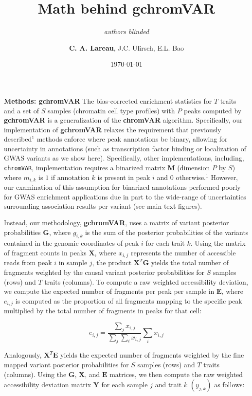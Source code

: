 \documentclass{article}\usepackage[]{graphicx}\usepackage[]{color}
\title{Math behind \textbf{gchromVAR}}
\author{\textit{authors blinded}}
\author{\textbf{C. A. Lareau}, J.C. Ulirsch, E.L. Bao}
\date{\today}
\begin{document}
\maketitle

\noindent \textbf{Methods: gchromVAR} \newline
The bias-corrected enrichment statistics for $T$ traits and a set of $S$ samples (chromatin cell type profiles) with $P$ peaks computed by \textbf{gchromVAR} is a generalization of the \textbf{chromVAR} algorithm. Specifically, our implementation of \textbf{gchromVAR} relaxes the requirement that previously described$^{1}$ methods enforce where peak annotations be binary, allowing for uncertainty in annotations (such as transcription factor binding or localization of GWAS variants as we show here). Specifically, other implementations, including, \texttt{chromVAR}, implementation requires a binarized matrix $\boldsymbol{M}$ (dimension $P$ by $S$) where $m_{i,k}$ is $1$ if annotation $k$ is present in peak $i$ and $0$ otherwise.$^1$ However, our examination of this assumption for binarized annotations performed poorly for GWAS enrichment applications due in part to the wide-range of uncertainties surrounding association results per-variant (see main text figures). \newline

\noindent Instead, our methodology, \textbf{gchromVAR}, uses a matrix of variant posterior probabilities $\boldsymbol{G}$, where $g_{i,k}$ is the sum of the posterior probabilities of the variants contained in the genomic coordinates of peak $i$ for each trait $k$. Using the matrix of fragment counts in peaks $\boldsymbol{X}$, where $x_{i,j}$ represents the number of accessible reads from peak $i$ in sample $j$, the product $\boldsymbol{X}^T\boldsymbol{G}$ yields the total number of fragments weighted by the causal variant posterior probabilities for $S$ samples (rows) and $T$ traits (columns). To compute a raw weighted accessibility deviation, we compute the expected number of fragments per peak per sample in $\boldsymbol{E}$, where $e_{i,j}$  is computed as the proportion of all fragments mapping to the specific peak multiplied by the total number of fragments in peaks for that cell: 

$$ e_{i,j} = \frac{\sum_jx_{i,j}}{\sum_j\sum_ix_{i,j}} \sum_ix_{i,j}$$

\noindent Analogously, $\boldsymbol{X}^T\boldsymbol{E}$ yields the expected number of fragments weighted by the fine mapped variant posterior probabilities for $S$ samples (rows) and $T$ traits (columns). Using the $\boldsymbol{G}$,  $\boldsymbol{X}$, and  $\boldsymbol{E}$ matrices, we then compute the raw weighted accessibility deviation matrix $\boldsymbol{Y}$ for each sample $j$ and trait $k$ $(y_{j,k})$ as follows:
\end{document}
